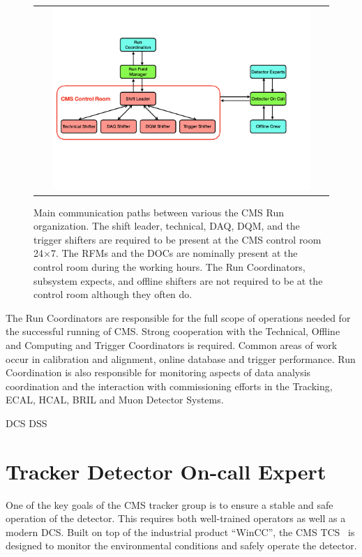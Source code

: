 \begin{figure}[tbh!]
 \begin{center}
 \begin{tabular}{c}
 \includegraphics[width=0.9\textwidth]{figures/Part2/Operation/RC}
 \end{tabular}
 \caption{Main communication paths between various  the \ac{CMS} Run organization. The shift leader, technical, \ac{DAQ}, \ac{DQM}, and the trigger shifters are required to be present at the \ac{CMS} control room 24$\times$7. The \acp{RFM} and the \acp{DOC} are nominally present at the control room during the working hours. The Run Coordinators, subsystem expects, and offline shifters are not required to be at the control room although they often do.}
 \label{fig:RC}
 \end{center}
\end{figure}

The Run Coordinators are responsible for the full scope of operations needed for the successful running of CMS. Strong cooperation with the Technical, Offline and Computing and Trigger Coordinators is required. Common areas of work occur in calibration and alignment, online database and trigger performance. Run Coordination is also responsible for monitoring aspects of data analysis coordination and the interaction with commissioning efforts in the Tracking, ECAL, HCAL, BRIL and Muon Detector Systems.

\ac{DCS} \ac{DSS}

\section{Tracker Detector On-call Expert}
\label{sec:DOC}

One of the key goals of the \ac{CMS} tracker group is to ensure a stable and safe operation of the detector. This requires both well-trained operators as well as a modern \ac{DCS}. Built on top of the industrial product “WinCC”, the \ac{CMS} \ac{TCS}~\cite{Shah:2009zz,Karimeh:2020tzx} is designed to monitor the environmental conditions and safely operate the detector.

